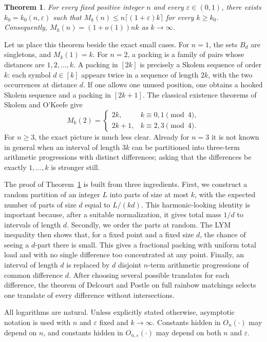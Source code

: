 \documentclass[10pt,a4paper]{amsart}
\numberwithin{equation}{section}
\newtheorem{theorem}{Theorem}[section]
\newcommand{\eps}{\varepsilon}
\begin{document}
\begin{theorem}\label{thm:main}
For every fixed positive integer $n$ and every $\eps\in(0,1)$, there exists
$k_0=k_0(n,\eps)$ such that $M_k(n)\le n\lceil(1+\eps)k\rceil$ for every
$k\ge k_0$.  Consequently, $M_k(n)=(1+o(1))nk$ as $k\to\infty$.
\end{theorem}

Let us place this theorem beside the exact small cases.  For $n=1$, the sets
$B_d$ are singletons, and $M_k(1)=k$.  For $n=2$, a packing is a family of
pairs whose distances are $1,2,\ldots,k$.  A packing in $[2k]$ is precisely a
Skolem sequence of order $k$: each symbol $d\in[k]$ appears twice in a sequence
of length $2k$, with the two occurrences at distance $d$.  If one allows one
unused position, one obtains a hooked Skolem sequence and a packing in
$[2k+1]$.  The classical existence theorems of Skolem and O'Keefe
\cite{OKeefe1961, Skolem1957} give
\[
 M_k(2)=
 \begin{cases}
  2k,   & k\equiv0,1\pmod4,\\
  2k+1, & k\equiv2,3\pmod4.
 \end{cases}
\]
For $n\ge3$, the exact picture is much less clear.  Already for $n=3$ it is
not known in general when an interval of length $3k$ can be partitioned into
three-term arithmetic progressions with distinct differences; asking that the
differences be exactly $1,\ldots,k$ is stronger still.

The proof of Theorem~\ref{thm:main} is built from three ingredients.  First, we
construct a random partition of an integer $L$ into parts of size at most $k$,
with the expected number of parts of size $d$ equal to $L/(kd)$.  This
harmonic-looking identity is important because, after a suitable normalization,
it gives total mass $1/d$ to intervals of length $d$.  Secondly, we order the
parts at random.  The LYM inequality then shows that, for a fixed point and a
fixed size $d$, the chance of seeing a $d$-part there is small.  This gives a
fractional packing with uniform total load and with no single difference too
concentrated at any point.  Finally, an interval of length $d$ is replaced by
$d$ disjoint $n$-term arithmetic progressions of common difference $d$.  After
choosing several possible translates for each difference, the theorem of
Delcourt and Postle on full rainbow matchings selects one translate of every
difference without intersections.

All logarithms are natural.  Unless explicitly stated otherwise, asymptotic
notation is used with $n$ and $\eps$ fixed and $k\to\infty$.  Constants hidden
in $O_n(\cdot)$ may depend on $n$, and constants hidden in
$O_{n,\eps}(\cdot)$ may depend on both $n$ and $\eps$.
\end{document}
